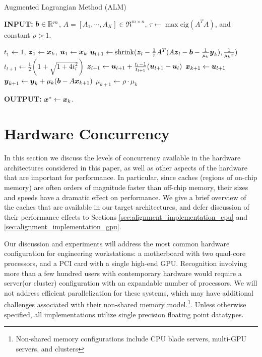 \documentclass[10pt,twocolumn,letterpaper]{article}
\begin{document}
 \begin{algorithm}[h]
\caption{Augmented Lagrangian Method (ALM)}
{\bf INPUT:} ${\boldsymbol{b}} \in {\mathbb{R}}^m$, $A=[A_1,\cdots, A_K] \in \Re^{m \times n}$, $\tau\leftarrow \max\mbox{eig}(A^TA)$, and constant $\rho>1$.
\begin{algorithmic}[1]
\STATE $t_1 \leftarrow 1$, ${\boldsymbol{z}}_1 \leftarrow {\boldsymbol{x}}_k$, ${\boldsymbol{u}}_1 \leftarrow {\boldsymbol{x}}_k$ 
\STATE ${\boldsymbol{u}}_{l+1}  \leftarrow \mbox{shrink}({\boldsymbol{z}}_l - \frac{1}{\tau}A^T(A{\boldsymbol{z}}_l - {\boldsymbol{b}} - \frac{1}{\mu_k}{\boldsymbol{y}}_k), \frac{1}{\mu_k\tau})$
\STATE $t_{l+1} \leftarrow \frac{1}{2}( 1 + \sqrt{1+4t_l^2})$
\STATE ${\boldsymbol{z}}_{l+1} \leftarrow {\boldsymbol{u}}_{l+1}+ \frac{t_l - 1}{t_{l+1}}({\boldsymbol{u}}_{l+1} - {\boldsymbol{u}}_l)$ 
\ENDWHILE 
\STATE ${\boldsymbol{x}}_{k+1} \leftarrow {\boldsymbol{u}}_{l+1}$ 
\STATE ${\boldsymbol{y}}_{k+1} \leftarrow {\boldsymbol{y}}_k + \mu_k ({\boldsymbol{b}} - A{\boldsymbol{x}}_{k+1})$ 
\STATE $\mu_{k+1} \leftarrow \rho\cdot\mu_k$ 
\ENDWHILE 
\end{algorithmic}

{\bf OUTPUT:} ${\boldsymbol{x}}^* \leftarrow {\boldsymbol{x}}_k$.
\label{alg:alm}
\end{algorithm}

\section{Hardware Concurrency} \label{sec:concurrency}

In this section we discuss the levels of concurrency available in the hardware
architectures considered in this paper, as well as other aspects of the
hardware that are important for performance.  In particular, since caches
(regions of on-chip memory) are often orders of magnitude faster than off-chip
memory, their sizes and speeds have a dramatic effect on performance.  We give a
brief overview of the caches that are available in our target architectures,
and defer discussion of their performance effects to Sections
\ref{sec:alignment_implementation_cpu} and
\ref{sec:alignment_implementation_gpu}.

Our discussion and experiments will address the most common hardware
configuration for engineering workstations: a motherboard with two quad-core
processors, and a PCI card with a single high-end GPU.  
Recognition involving more than a few hundred users with contemporary hardware
would require a server(or cluster) configuration with an expandable 
number of processors.  We will not address efficient parallelization for 
these systems, which may have additional challenges associated with
their non-shared memory model.\footnote{Non-shared memory configurations
include CPU blade servers, multi-GPU servers, and clusters}.
Unless otherwise specified, all implementations utilize single precision
floating point datatypes.  
\end{document}

